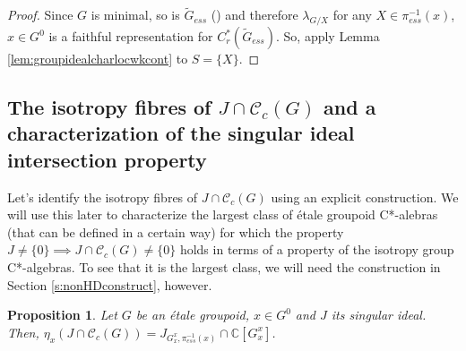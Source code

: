 \documentclass[a4paper, 12pt]{amsart}
\newtheorem{prp}[thm]{Proposition}
\theoremstyle{definition}
\theoremstyle{remark}
\numberwithin{equation}{section}
\begin{document}
\begin{proof}
    Since $G$ is minimal, so is $\tilde{G}_{ess}$ (\cite[Lemma~5.1]{BGHL25}) and therefore $\lambda_{G/X}$ for any $X\in \pi^{-1}_{ess}(x)$, $x\in G^{0}$ is a faithful representation for $C^{*}_{r}(\tilde{G}_{ess})$. So, apply Lemma \ref{lem:groupidealcharlocwkcont} to $S = \{X\}$.
\end{proof}

\subsection{The isotropy fibres of $J\cap\mathscr{C}_{c}(G)$ and a characterization of the singular ideal intersection property}
\label{ss:isofibrealgsing}

 Let's identify the isotropy fibres of $J\cap\mathscr{C}_{c}(G)$ using an explicit construction. We will use this later to characterize the largest class of \'etale groupoid C*-alebras (that can be defined in a certain way) for which the property $J\neq \{0\}\implies J\cap\mathscr{C}_{c}(G)\neq \{0\}$ holds in terms of a property of the isotropy group C*-algebras. To see that it is the largest class, we will need the construction in Section \ref{s:nonHDconstruct}, however.

\begin{prp}
\label{prp:algisofibre}
    Let $G$ be an \'etale groupoid, $x\in G^{0}$ and $J$ its singular ideal. Then, $\eta_{x}(J\cap\mathscr{C}_{c}(G)) = J_{G^{x}_{x}, \pi^{-1}_{ess}(x)}\cap \mathbb{C}[G^{x}_{x}]$.
\end{prp}
\end{document}

